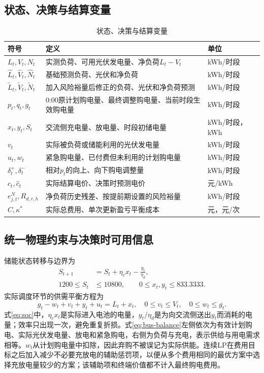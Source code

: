 \documentclass[UTF8,12pt,a4paper]{ctexart}
\theoremstyle{remark}
\begin{document}
\subsection{状态、决策与结算变量}
\begin{table}[H]\centering\small\caption{状态、决策与结算变量}\label{tab:variables}
\begin{tabular}{p{}p{}p{}}\toprule 符号&定义&单位\\\midrule
$L_t,V_t,N_t$&实测负荷、可用光伏发电量、净负荷$L_t-V_t$&kWh/时段\\
$\widehat L_t,\widehat V_t,\widehat N_t$&基础预测负荷、光伏和净负荷&kWh/时段\\
$\widetilde L_t,\widetilde V_t,\widetilde N_t$&加入风险裕量后修正的负荷、光伏和净负荷预测&kWh/时段\\
$p_t,q_t,g_t$&0:00原计划购电量、最终调整购电量、当前时段生效购电量&kWh/时段\\
$x_t,y_t,S_t$&交流侧充电量、放电量、时段初储电量&kWh/时段，kWh\\
$v_t$&实际被负荷或储能利用的光伏发电量&kWh/时段\\
$u_t,w_t$&紧急购电量、已付费但未利用的计划购电量&kWh/时段\\
$\delta_t^+,\delta_t^-$&相对$p_t$的向上、向下购电调整量&kWh/时段\\
$c_t,\widehat c_t$&实际结算电价、决策时预测电价&元/kWh\\
$e^N_{j,t},R_{d,r,h}$&净负荷历史残差、按提前期设置的风险裕量&kWh/时段\\
$C,\kappa^*$&实际总费用、单次更新盈亏平衡成本&元，元/次\\\bottomrule
\end{tabular}\end{table}

\subsection{统一物理约束与决策时可用信息}
储能状态转移与边界为
\begin{align}
S_{t+1}&=S_t+\eta_cx_t-\frac{y_t}{\eta_d},\label{eq:soc}\\
1200\le S_t&\le10800,\qquad0\le x_t,y_t\le833.3333.\label{eq:battery-bound}
\end{align}
实际调度环节的供需平衡方程为
\begin{equation}g_t-w_t+v_t+y_t+u_t=L_t+x_t,\quad0\le v_t\le V_t,\quad0\le w_t\le g_t.\label{eq:bus-balance}\end{equation}
式\eqref{eq:soc}中，$\eta_cx_t$是实际进入电池的电量，$y_t/\eta_d$是为向交流侧送出$y_t$而消耗的电量；效率只出现一次，避免重复折损。式\eqref{eq:bus-balance}左侧依次为有效计划购电、实际光伏发电量、放电和紧急购电，右侧为负荷与充电，表示供给与用电需求相等。$w_t$从计划购电量中扣除，因此弃购不被误记为实际供能。连续LP在费用目标之后加入减少不必要充放电的辅助惩罚项，以便从多个费用相同的最优方案中选择充放电量较少的方案；该辅助项和终端价值都不计入最终购电费用。
\end{document}
